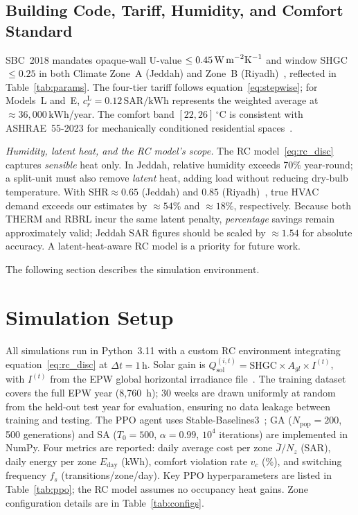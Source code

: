 \documentclass[12pt,a4paper]{article}
\let\oldsection\section
\renewcommand{\section}[1]{\FloatBarrier\oldsection{#1}}
\let\oldsubsection\subsection
\renewcommand{\subsection}[1]{\FloatBarrier\oldsubsection{#1}}
\newcommand{\Jbar}{\bar{J}}
\newcommand{\SAR}{\text{SAR}}
\newcommand{\kWh}{\text{kWh}}
\begin{document}
\subsection{Building Code, Tariff, Humidity, and Comfort Standard}
\label{subsec:sbc}

SBC~2018 mandates opaque-wall U-value $\le0.45\,\text{W\,m}^{-2}\text{K}^{-1}$
and window SHGC $\le0.25$ in both Climate Zone~A (Jeddah) and Zone~B
(Riyadh)~\cite{Alayed2021}, reflected in Table~\ref{tab:params}.
The four-tier tariff follows equation~\eqref{eq:stepwise}; for Models~L
and~E, $c_r^{\mathrm{L}}=0.12\,\SAR/\kWh$ represents the weighted
average at $\approx36{,}000\,\kWh$/year.
The comfort band $[22,26]\,^\circ$C is consistent with ASHRAE~55-2023
for mechanically conditioned residential spaces~\cite{Bienvenido2024}.

\emph{Humidity, latent heat, and the RC model's scope.}
The RC model~\eqref{eq:rc_disc} captures \emph{sensible} heat only.
In Jeddah, relative humidity exceeds 70\% year-round; a split-unit must
also remove \emph{latent} heat, adding load without reducing dry-bulb temperature.
With $\mathrm{SHR}\approx0.65$ (Jeddah) and $0.85$ (Riyadh)~\cite{Rodrigues2025},
true HVAC demand exceeds our estimates by $\approx54\%$ and $\approx18\%$, respectively.
Because both THERM and RBRL incur the same latent penalty, \emph{percentage}
savings remain approximately valid; Jeddah SAR figures should be scaled by
$\approx1.54$ for absolute accuracy.
A latent-heat-aware RC model is a priority for future work.

The following section describes the simulation environment.

\section{Simulation Setup}
\label{sec:sim}

All simulations run in Python~3.11 with a custom RC environment
integrating equation~\eqref{eq:rc_disc} at $\Delta t=1\,\text{h}$.
Solar gain is $Q_{\mathrm{sol}}^{(i,t)}=\text{SHGC}\times A_{gl}\times I^{(t)}$,
with $I^{(t)}$ from the EPW global horizontal irradiance file~\cite{EPW2023}.
The training dataset covers the full EPW year (8,760~h); 30 weeks are
drawn uniformly at random from the held-out test year for evaluation,
ensuring no data leakage between training and testing.
The PPO agent uses Stable-Baselines3~\cite{Raffin2021}; GA ($N_{\text{pop}}=200$,
500 generations) and SA ($T_0=500$, $\alpha=0.99$, $10^4$
iterations) are implemented in NumPy.
Four metrics are reported: daily average cost per zone $\Jbar/N_z$
(SAR), daily energy per zone $E_{\mathrm{day}}$ (kWh), comfort violation
rate $v_c$ (\%), and switching frequency $f_s$ (transitions/zone/day).
Key PPO hyperparameters are listed in Table~\ref{tab:ppo}; the RC
model assumes no occupancy heat gains.
Zone configuration details are in Table~\ref{tab:configs}.
\end{document}
